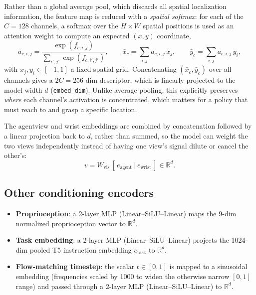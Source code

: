 \documentclass[11pt]{article}
\begin{document}
Rather than a global average pool, which discards all spatial localization information, the
feature map is reduced with a \emph{spatial softmax}: for each of the $C = 128$ channels, a
softmax over the $H\times W$ spatial positions is used as an attention weight to compute an
expected $(x, y)$ coordinate,
\begin{equation}
    a_{c,i,j} = \frac{\exp(f_{c,i,j})}{\sum_{i',j'} \exp(f_{c,i',j'})}, \qquad
    \bar{x}_c = \sum_{i,j} a_{c,i,j}\, x_{j}, \qquad
    \bar{y}_c = \sum_{i,j} a_{c,i,j}\, y_{i},
\end{equation}
with $x_j, y_i \in [-1, 1]$ a fixed spatial grid. Concatenating $(\bar{x}_c, \bar{y}_c)$ over all
channels gives a $2C = 256$-dim descriptor, which is linearly projected to the model width
$d$ (\texttt{embed\_dim}). Unlike average pooling, this explicitly preserves \emph{where} each
channel's activation is concentrated, which matters for a policy that must reach to and grasp a
specific location.

The agentview and wrist embeddings are combined by concatenation followed by a linear projection
back to $d$, rather than summed, so the model can weight the two views independently instead of
having one view's signal dilute or cancel the other's:
\begin{equation}
    v = W_{\text{vis}} \, [\, e_{\text{agent}} \,\Vert\, e_{\text{wrist}} \,] \in \mathbb{R}^d.
\end{equation}

\subsection{Other conditioning encoders}

\begin{itemize}[nosep]
    \item \textbf{Proprioception}: a 2-layer MLP (Linear--SiLU--Linear) maps the 9-dim
    normalized proprioception vector to $\mathbb{R}^d$.
    \item \textbf{Task embedding}: a 2-layer MLP (Linear--SiLU--Linear) projects the 1024-dim
    pooled T5 instruction embedding $e_{\text{task}}$ to $\mathbb{R}^d$.
    \item \textbf{Flow-matching timestep}: the scalar $t \in [0, 1]$ is mapped to a sinusoidal
    embedding (frequencies scaled by 1000 to widen the otherwise narrow $[0,1]$ range) and passed
    through a 2-layer MLP (Linear--SiLU--Linear) to $\mathbb{R}^d$.
\end{itemize}
\end{document}
